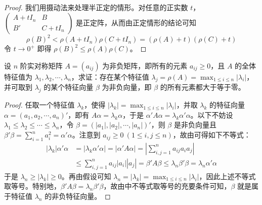 \documentclass[../../main.tex]{subfiles}%
\begin{document}
\begin{proof}
我们用摄动法来处理半正定的情形。对任意的正实数 \(t\)，\(\begin{pmatrix}
A + tI_n & B \\
B' & C + tI_n
\end{pmatrix}\) 是正定阵，从而由正定情形的结论可知
\[
\rho(B)^2 < \rho(A + tI_n)\rho(C + tI_n) = (\rho(A) + t)(\rho(C) + t)
\]
令 \(t \to 0^{+}\) 即得 \(\rho(B)^2 \leqslant  \rho(A)\rho(C)\)。 
\end{proof}

\begin{proposition}\label{proposition:例9.58}
设 \(n\) 阶实对称矩阵 \(A = (a_{ij})\) 为非负矩阵，即所有的元素 \(a_{ij} \geqslant  0\)，且 \(A\) 的全体特征值为 \(\lambda_1,\lambda_2,\cdots,\lambda_n\)，求证：存在某个特征值 \(\lambda_j = \rho(A) = \max_{1\leqslant  i \leqslant  n}|\lambda_i|\)，并可取到 \(\lambda_j\) 的某个特征向量 \(\beta\) 为非负向量，即 \(\beta\) 的所有元素都大于等于零。
\end{proposition}
\begin{proof}
任取一个特征值 \(\lambda_k\)，使得 \(|\lambda_k| = \max_{1\leqslant  i \leqslant  n}|\lambda_i|\)，并取 \(\lambda_k\) 的特征向量 \(\alpha = (a_1,a_2,\cdots,a_n)'\)，即有 \(A\alpha = \lambda_k\alpha\)，于是 \(\alpha'A\alpha = \lambda_k\alpha'\alpha\)。以下不妨设 \(\lambda_1 \leqslant  \lambda_2 \leqslant  \cdots \leqslant  \lambda_n\)，令 \(\beta = (|a_1|,|a_2|,\cdots,|a_n|)'\)，则 \(\beta\) 是非负向量且 \(\beta'\beta = \sum_{i = 1}^{n}a_i^2 = \alpha'\alpha\)。注意到 \(a_{ij} \geqslant  0\ (1\leqslant  i,j \leqslant  n)\)，故由可得如下不等式：
\begin{align*}
|\lambda_k|\alpha'\alpha &= |\lambda_k\alpha'\alpha| = |\alpha'A\alpha| = \left|\sum_{i,j = 1}^{n}a_{ij}a_ia_j\right|\\
&\leqslant  \sum_{i,j = 1}^{n}a_{ij}|a_i||a_j| = \beta'A\beta \leqslant  \lambda_n\beta'\beta = \lambda_n\alpha'\alpha
\end{align*}
于是 \(\lambda_n \geqslant  |\lambda_k| \geqslant  0\)。再由假设可知 \(\lambda_n = |\lambda_k| = \max_{1\leqslant  i \leqslant  n}|\lambda_i|\)，因此上述不等式取等号。特别地，\(\beta'A\beta = \lambda_n\beta'\beta\)，故由中不等式取等号的充要条件可知，\(\beta\) 就是属于特征值 \(\lambda_n\) 的非负特征向量。 
\end{proof}
\end{document}
